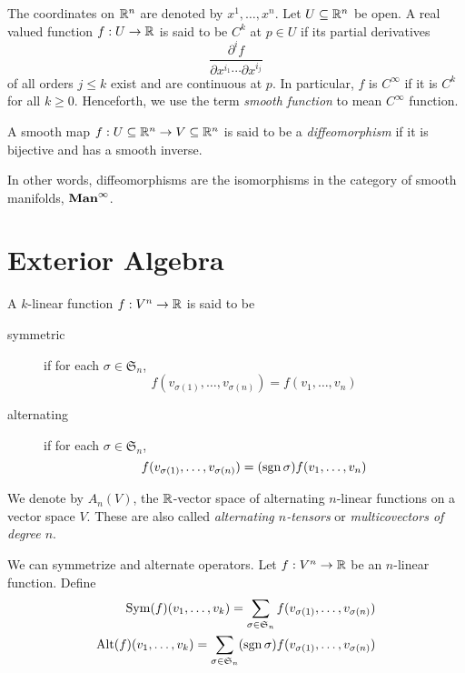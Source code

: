 The coordinates on $\mathbb{R}^n$ are denoted by $x^1,\ldots,x^n$. Let $U\subseteq\mathbb{R}^n$ be open. A real valued function $f: U\to\mathbb{R}$ is said to be $C^k$ at $p\in U$ if its partial derivatives 
\begin{equation*}
    \frac{\partial^i f}{\partial x^{i_1}\cdots\partial x^{i_j}}
\end{equation*}
of all orders $j\le k$ exist and are continuous at $p$. In particular, $f$ is $C^\infty$ if it is $C^k$ for all $k\ge 0$. Henceforth, we use the term \textit{smooth function} to mean $C^\infty$ function.

\begin{definition}[Diffeomorphism]
    A smooth map $f: U\subseteq\mathbb{R}^n\to V\subseteq\mathbb{R}^n$ is said to be a \textit{diffeomorphism} if it is bijective and has a smooth inverse.
\end{definition}

In other words, diffeomorphisms are the isomorphisms in the category of smooth manifolds, $\mathbf{Man}^\infty$.

\section{Exterior Algebra}

\begin{definition}
    A $k$-linear function $f: V^n\to\mathbb{R}$ is said to be 
    \begin{description}
        \item[symmetric] if for each $\sigma\in\mathfrak S_n$,
        \begin{equation*}
            f(v_{\sigma(1)},\ldots,v_{\sigma(n)}) = f(v_1,\ldots,v_n)
        \end{equation*}
        \item[alternating] if for each $\sigma\in\mathfrak S_n$,
        \begin{equation*}
            f(v_{\sigma(1)},\ldots,v_{\sigma(n)}) = (\operatorname{sgn}\sigma) f(v_1,\ldots,v_n)
        \end{equation*}
    \end{description}
\end{definition}

We denote by $A_n(V)$, the $\mathbb{R}$-vector space of alternating $n$-linear functions on a vector space $V$. These are also called \textit{alternating $n$-tensors} or \textit{multicovectors of degree $n$}.


We can symmetrize and alternate operators. Let $f: V^n\to\mathbb{R}$ be an $n$-linear function. Define 
\begin{align*}
    \operatorname{Sym}(f)(v_1,\ldots,v_k) = \sum_{\sigma\in\mathfrak S_n}f(v_{\sigma(1)},\ldots,v_{\sigma(n)})\\
    \operatorname{Alt}(f)(v_1,\ldots,v_k) = \sum_{\sigma\in\mathfrak S_n}(\operatorname{sgn}\sigma)f(v_{\sigma(1)},\ldots,v_{\sigma(n)})
\end{align*}

